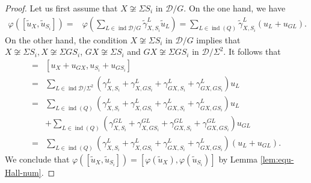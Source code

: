 \documentclass[12pt,reqno]{amsart}
\numberwithin{equation}{section}
\begin{document}
\begin{proof}
		Let us first assume that $X\not\cong \Sigma S_i$ in $\mathcal{D}/G$.
		On the one hand, we have
		\begin{align*}
			\varphi([ \tilde{u}_{{X}}, \tilde{u}_{{S_i}}])=& \varphi(\sum_{{L}\in \operatorname{ind}\mathcal{D}/G}  \tilde{\gamma}_{{X}, {S_i}}^{{L}} \tilde{u}_{{L}})
			= \sum_{L\in\operatorname{ind}(Q)}\tilde{\gamma}_{{X},{S_i}}^{{L}}(u_L+u_{GL}).
		\end{align*}
		On the other hand, the condition $X\not\cong \Sigma S_i$ in $\mathcal{D}/G$ implies that $X\not\cong \Sigma S_i,X\not\cong\Sigma GS_i$, $GX\not\cong\Sigma S_i$ and $GX\not\cong \Sigma GS_i$ in $\mathcal{D}/\Sigma^2$. It follows that
		\begin{align*}
			[\varphi( \tilde{u}_{{X}}),\varphi(\tilde{u}_{{S_i}})]
			=&
			[u_X+u_{GX},u_{S_i}+u_{G{S_i}}]\\
			=&\sum_{L\in\operatorname{ind}\mathcal{D}/\Sigma^2}(\gamma_{X,{S_i}}^L+\gamma_{X,G{S_i}}^L+\gamma_{GX,{S_i}}^L+\gamma_{GX,G{S_i}}^L)u_L \\
			=& \sum_{L\in\operatorname{ind}(Q)}(\gamma_{X,{S_i}}^L+\gamma_{X,G{S_i}}^L+\gamma_{GX,{S_i}}^L+\gamma_{GX,G{S_i}}^L)u_L 
			\\
			&+\sum_{L\in\operatorname{ind}(Q)}(\gamma_{X,{S_i}}^{GL}+\gamma_{X,G{S_i}}^{GL}+\gamma_{GX,{S_i}}^{GL}+\gamma_{GX,G{S_i}}^{GL})u_{GL}
			\\
			=&\sum_{L\in\operatorname{ind}(Q)}(\gamma_{X,{S_i}}^L+\gamma_{X,G{S_i}}^L+\gamma_{GX,{S_i}}^L+\gamma_{GX,G{S_i}}^L)(u_L+u_{GL}). 
		\end{align*}
		We conclude that  $\varphi([ \tilde{u}_{{X}}, \tilde{u}_{{S_i}}])=[\varphi( \tilde{u}_{{X}}),\varphi(\tilde{u}_{{S_i}})]$ by Lemma \ref{lem:equ-Hall-num}.
		

\end{proof}
\end{document}
